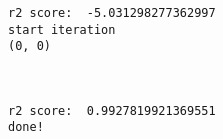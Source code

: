 \documentclass[11pt]{article}
\begin{document}
    \begin{Verbatim}[commandchars=\\\{\}]
r2 score:  -5.031298277362997
start iteration
(0, 0)

    \end{Verbatim}

    \begin{center}
    \end{center}
    { \hspace*{\fill} \\}
    
    \begin{Verbatim}[commandchars=\\\{\}]
r2 score:  0.9927819921369551
done!

    \end{Verbatim}
\end{document}
